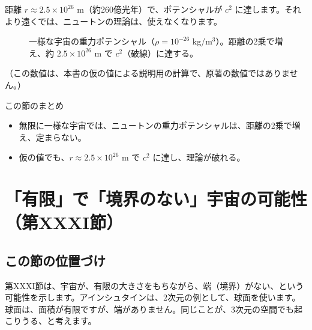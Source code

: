 \documentclass[a4paper,11pt,openany]{ltjsbook}
\begin{document}
距離 $r\approx2.5\times10^{26}$ m（約260億光年）で、ポテンシャルが $c^2$ に達します。それより遠くでは、ニュートンの理論は、使えなくなります。

\begin{figure}[htbp]
\centering
{}
\caption{一様な宇宙の重力ポテンシャル（$\rho=10^{-26}$ kg/m$^3$）。距離の2乗で増え、約 $2.5\times10^{26}$ m で $c^2$（破線）に達する。}
\end{figure}

（この数値は、本書の仮の値による説明用の計算で、原著の数値ではありません。）

\begin{pointbox}{この節のまとめ}
\begin{itemize}[leftmargin=*]
\item 無限に一様な宇宙では、ニュートンの重力ポテンシャルは、距離の2乗で増え、定まらない。
\item 仮の値でも、$r\approx2.5\times10^{26}$ m で $c^2$ に達し、理論が破れる。
\end{itemize}
\end{pointbox}

\chapter{「有限」で「境界のない」宇宙の可能性（第XXXI節）}

\section{この節の位置づけ}

第XXXI節は、宇宙が、有限の大きさをもちながら、端（境界）がない、という可能性を示します。アインシュタインは、2次元の例として、球面を使います。球面は、面積が有限ですが、端がありません。同じことが、3次元の空間でも起こりうる、と考えます。
\end{document}
